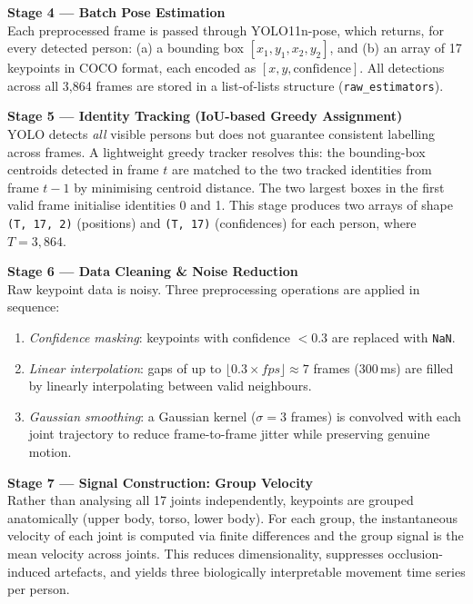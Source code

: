 \documentclass[11pt]{article}
\begin{document}
\vspace{0.5em}
\noindent\textbf{Stage 4 — Batch Pose Estimation}\\
Each preprocessed frame is passed through YOLO11n-pose, which returns, for every detected person: (a) a bounding box \([x_1, y_1, x_2, y_2]\), and (b) an array of 17 keypoints in COCO format, each encoded as \([x, y, \text{confidence}]\). All detections across all 3,864 frames are stored in a list-of-lists structure (\texttt{raw\_estimators}).

\vspace{0.5em}
\noindent\textbf{Stage 5 — Identity Tracking (IoU-based Greedy Assignment)}\\
YOLO detects \textit{all} visible persons but does not guarantee consistent labelling across frames. A lightweight greedy tracker resolves this: the bounding-box centroids detected in frame $t$ are matched to the two tracked identities from frame $t-1$ by minimising centroid distance. The two largest boxes in the first valid frame initialise identities 0 and 1. This stage produces two arrays of shape \texttt{(T, 17, 2)} (positions) and \texttt{(T, 17)} (confidences) for each person, where \(T = 3{,}864\).

\vspace{0.5em}
\noindent\textbf{Stage 6 — Data Cleaning \& Noise Reduction}\\
Raw keypoint data is noisy. Three preprocessing operations are applied in sequence:
\begin{enumerate}
    \item \textit{Confidence masking}: keypoints with confidence $< 0.3$ are replaced with \texttt{NaN}.
    \item \textit{Linear interpolation}: gaps of up to $\lfloor 0.3 \times fps \rfloor \approx 7$ frames (300\,ms) are filled by linearly interpolating between valid neighbours.
    \item \textit{Gaussian smoothing}: a Gaussian kernel ($\sigma = 3$ frames) is convolved with each joint trajectory to reduce frame-to-frame jitter while preserving genuine motion.
\end{enumerate}

\vspace{0.5em}
\noindent\textbf{Stage 7 — Signal Construction: Group Velocity}\\
Rather than analysing all 17 joints independently, keypoints are grouped anatomically (upper body, torso, lower body). For each group, the instantaneous velocity of each joint is computed via finite differences and the group signal is the mean velocity across joints. This reduces dimensionality, suppresses occlusion-induced artefacts, and yields three biologically interpretable movement time series per person.
\end{document}
